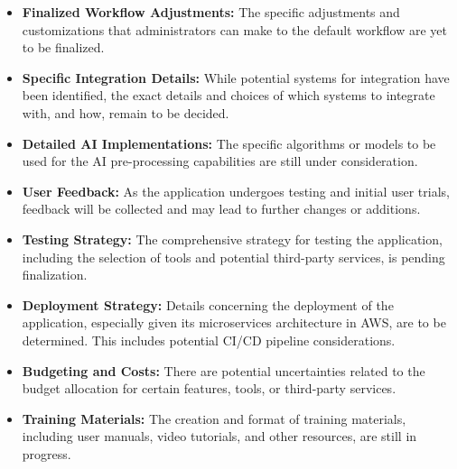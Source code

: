 \begin{itemize}
    \item \textbf{Finalized Workflow Adjustments:} The specific adjustments and customizations that administrators can make to the default workflow are yet to be finalized.

    \item \textbf{Specific Integration Details:} While potential systems for integration have been identified, the exact details and choices of which systems to integrate with, and how, remain to be decided.

    \item \textbf{Detailed AI Implementations:} The specific algorithms or models to be used for the AI pre-processing capabilities are still under consideration.

    \item \textbf{User Feedback:} As the application undergoes testing and initial user trials, feedback will be collected and may lead to further changes or additions.

    \item \textbf{Testing Strategy:} The comprehensive strategy for testing the application, including the selection of tools and potential third-party services, is pending finalization.

    \item \textbf{Deployment Strategy:} Details concerning the deployment of the application, especially given its microservices architecture in AWS, are to be determined. This includes potential CI/CD pipeline considerations.

    \item \textbf{Budgeting and Costs:} There are potential uncertainties related to the budget allocation for certain features, tools, or third-party services.

    \item \textbf{Training Materials:} The creation and format of training materials, including user manuals, video tutorials, and other resources, are still in progress.
\end{itemize}